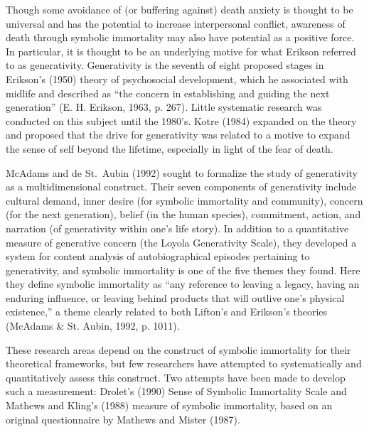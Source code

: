 \documentclass[
  english,
  man]{apa6}
\begin{document}
Though some avoidance of (or buffering against) death anxiety is thought
to be universal and has the potential to increase interpersonal
conflict, awareness of death through symbolic immortality may also have
potential as a positive force. In particular, it is thought to be an
underlying motive for what Erikson referred to as generativity.
Generativity is the seventh of eight proposed stages in Erikson's
(1950) theory of psychosocial development, which he associated
with midlife and described as ``the concern in establishing and guiding
the next generation'' (E. H. Erikson, 1963, p. 267). Little systematic research
was conducted on this subject until the 1980's. Kotre (1984)
expanded on the theory and proposed that the drive for generativity was
related to a motive to expand the sense of self beyond the lifetime,
especially in light of the fear of death.

McAdams and de St.~Aubin (1992) sought to formalize the study
of generativity as a multidimensional construct. Their seven components
of generativity include cultural demand, inner desire (for symbolic
immortality and community), concern (for the next generation), belief
(in the human species), commitment, action, and narration (of
generativity within one's life story). In addition to a quantitative
measure of generative concern (the Loyola Generativity Scale), they
developed a system for content analysis of autobiographical episodes
pertaining to generativity, and symbolic immortality is one of the five
themes they found. Here they define symbolic immortality as ``any
reference to leaving a legacy, having an enduring influence, or leaving
behind products that will outlive one's physical existence,'' a theme
clearly related to both Lifton's and Erikson's theories (McAdams \& St. Aubin, 1992, p. 1011).

These research areas depend on the construct of symbolic immortality for
their theoretical frameworks, but few researchers have attempted to
systematically and quantitatively assess this construct. Two attempts
have been made to develop such a measurement: Drolet's (1990)
Sense of Symbolic Immortality Scale and Mathews and Kling's
(1988) measure of symbolic immortality, based on an original
questionnaire by Mathews and Mister (1987).
\end{document}
